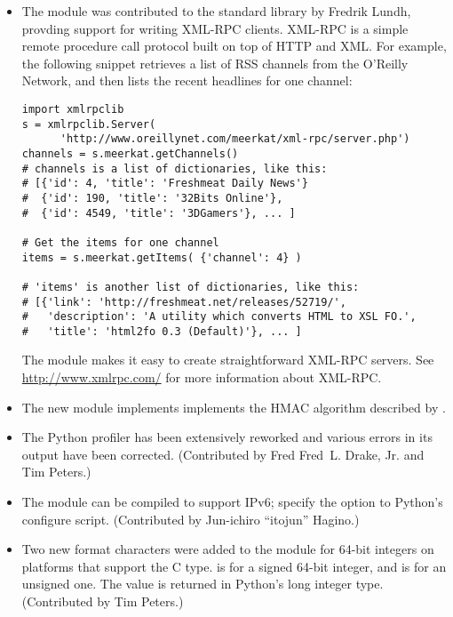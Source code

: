 \documentclass{howto}
\begin{document}
\begin{itemize}

  \item The  module was contributed to the standard
  library by Fredrik Lundh, provding support for writing XML-RPC
  clients.  XML-RPC is a simple remote procedure call protocol built on
  top of HTTP and XML. For example, the following snippet retrieves a
  list of RSS channels from the O'Reilly Network, and then 
  lists the recent headlines for one channel:

\begin{verbatim}
import xmlrpclib
s = xmlrpclib.Server(
      'http://www.oreillynet.com/meerkat/xml-rpc/server.php')
channels = s.meerkat.getChannels()
# channels is a list of dictionaries, like this:
# [{'id': 4, 'title': 'Freshmeat Daily News'}
#  {'id': 190, 'title': '32Bits Online'},
#  {'id': 4549, 'title': '3DGamers'}, ... ]

# Get the items for one channel
items = s.meerkat.getItems( {'channel': 4} )

# 'items' is another list of dictionaries, like this:
# [{'link': 'http://freshmeat.net/releases/52719/', 
#   'description': 'A utility which converts HTML to XSL FO.', 
#   'title': 'html2fo 0.3 (Default)'}, ... ]
\end{verbatim}

The  module makes it easy to create
straightforward XML-RPC servers.  See \url{http://www.xmlrpc.com/} for
more information about XML-RPC.

  \item The new  module implements implements the HMAC
  algorithm described by .

  \item The Python profiler has been extensively reworked and various
  errors in its output have been corrected.  (Contributed by Fred
  Fred~L. Drake, Jr. and Tim Peters.)
 
  \item The  module can be compiled to support IPv6;
  specify the  option to Python's configure
  script.  (Contributed by Jun-ichiro ``itojun'' Hagino.)

  \item Two new format characters were added to the 
  module for 64-bit integers on platforms that support the C
   type.   is for a signed 64-bit integer,
  and  is for an unsigned one.  The value is returned in
  Python's long integer type.  (Contributed by Tim Peters.)


\end{itemize}
\end{document}
